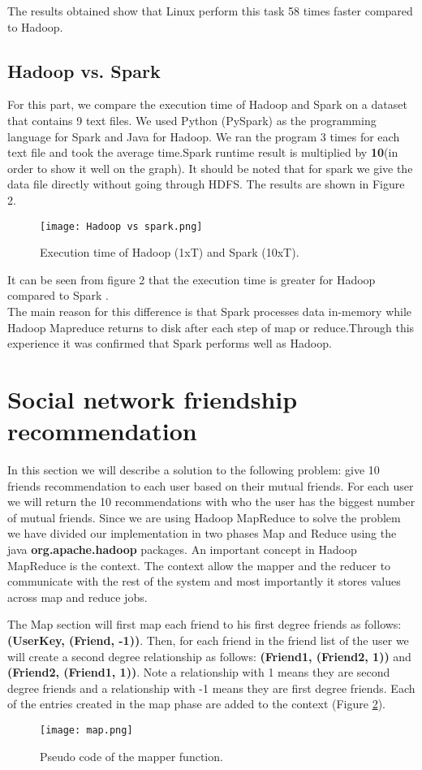 \documentclass[12pt]{article}
\begin{document}
\noindent The results obtained show that Linux perform this task 58 times faster compared to Hadoop.

\subsection{Hadoop vs. Spark}
For this part, we compare the execution time of Hadoop and Spark on a dataset that contains 9 text files. We used Python (PySpark) as the programming language for Spark and Java for Hadoop. We ran the program 3 times for each text file and took the average time.Spark runtime result is multiplied by \textbf{10}(in order to show it well on the graph). It should be noted that for spark we give the data file directly without going through HDFS. The results are shown in Figure 2.

\begin{figure}[h]
  \centering
  \texttt{[image: Hadoop vs spark.png]}
  \caption{Execution time of Hadoop (1xT) and Spark (10xT).}
  \label{fig:hadoop vs spark}
\end{figure}
It can be seen from figure 2 that the execution time is greater for Hadoop compared to Spark .\\
The main reason for this difference is that Spark processes data in-memory while Hadoop Mapreduce returns to disk after each step of map or reduce.Through this experience it was confirmed that Spark performs well as Hadoop.
\section{Social network friendship recommendation}
In this section we will describe a solution to the following problem:
give 10 friends recommendation to each user based on their mutual friends.
For each user we will return the 10 recommendations with who the user has the biggest number of mutual friends. Since we are using Hadoop MapReduce to solve the problem we have divided our implementation in two phases Map and Reduce using the java \textbf{org.apache.hadoop} packages. An important concept in Hadoop MapReduce is the context. The context allow the mapper and the reducer to communicate with the rest of the system and most importantly it stores values across map and reduce jobs. 


The Map section will first map each friend to his first degree friends as follows: \textbf{(UserKey, (Friend, -1))}.
Then, for each friend in the friend list of the user we will create a second degree relationship as follows: \textbf{(Friend1, (Friend2, 1))} and \textbf{(Friend2, (Friend1, 1))}. Note a relationship with 1 means they are second degree friends and a relationship with -1 means they are first degree friends. Each of the entries created in the map phase are added to the context (Figure \ref{fig:map}).
\begin{figure}[h]
  \centering
  \texttt{[image: map.png]}
  \caption{Pseudo code of the mapper function.}
  \label{fig:map}
\end{figure}
\end{document}
